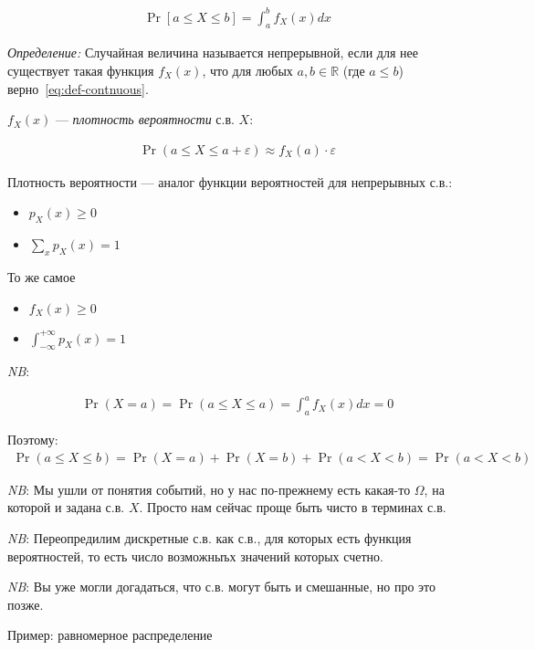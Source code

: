 \documentclass[12pt]{article}
\newcommand\R{\mathbb{R}}
\newcommand\eps{\varepsilon}
\begin{document}
  \begin{align}\label{eq:def-contnuous}
      \Pr[a \le X \le b] = \int_a^b f_X(x) dx 
  \end{align}

  \emph{Определение:} Случайная величина называется непрерывной, если для нее существует такая функция $f_X(x)$, что для любых $a, b \in \R$ (где $a \le b$) верно~\eqref{eq:def-contnuous}.


  $f_X(x)$ --- \emph{плотность вероятности} с.в. $X$:

  \begin{align*}
      \Pr(a \le X \le a + \eps) \approx f_X(a) \cdot \varepsilon 
  \end{align*}

  Плотность вероятности --- аналог функции вероятностей для непрерывных с.в.:

  \begin{itemize}
      \item $p_X(x) \ge 0$
      \item $\sum_x p_X(x) = 1$
  \end{itemize}

  То же самое
  \begin{itemize}
      \item $f_X(x) \ge 0$
      \item $\int_{-\infty}^{+\infty} p_X(x) = 1$
  \end{itemize}

  \emph{NB}:
  
  \begin{align*}
      \Pr(X = a) = \Pr(a \le X \le a) = \int_a^a f_X(x) dx = 0
  \end{align*}

  Поэтому:
  \begin{align*}
      \Pr(a \le X \le b) = \Pr(X = a) + \Pr(X = b) + \Pr(a < X < b) = \Pr(a < X < b) 
  \end{align*}

  \emph{NB}: Мы ушли от понятия событий, но у нас по-прежнему есть какая-то $\Omega$, на которой и задана с.в. $X$. Просто нам сейчас проще быть чисто в терминах с.в.


  \emph{NB}: Переопредилим дискретные с.в. как с.в., для которых есть функция вероятностей, то есть число возможныъх значений которых счетно.

  \emph{NB}: Вы уже могли догадаться, что с.в. могут быть и смешанные, но про это позже.

  
  Пример: равномерное распределение
\end{document}
